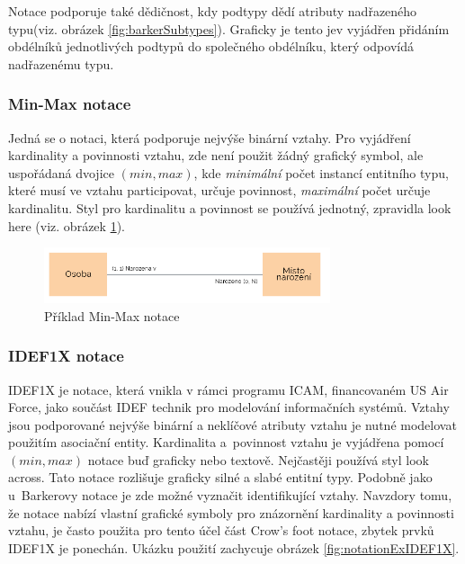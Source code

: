 \documentclass[czech,bachelor,public,dept460,male,oneside]{diploma}
\begin{document}
		Notace podporuje také dědičnost, kdy podtypy dědí atributy nadřazeného typu(viz. obrázek \ref{fig:barkerSubtypes}). Graficky je tento jev vyjádřen přidáním obdélníků jednotlivých podtypů do společného obdélníku, který odpovídá nadřazenému typu.
		
		\subsubsection{Min-Max notace} \label{minmax}
		Jedná se o notaci, která podporuje nejvýše binární vztahy. Pro vyjádření kardinality a povinnosti vztahu, zde není použit žádný grafický symbol, ale uspořádaná dvojice $(min, max)$, kde \emph{minimální} počet instancí entitního typu, které musí ve vztahu participovat, určuje povinnost, \emph{maximální} počet určuje kardinalitu. Styl pro kardinalitu a povinnost se používá jednotný, zpravidla look here (viz. obrázek \ref{fig:notationExMinMax}).
		
		\begin{figure}[!h]
			\centering
			\includegraphics[width=0.75\textwidth]{Figures/NotationExMinMax}
			\caption[Příklad Min-Max notace]{Příklad Min-Max notace \cite{whatIsERD}}
			\label{fig:notationExMinMax}
		\end{figure}
	
		\subsubsection{IDEF1X notace} \label{idef1x}
		IDEF1X \cite{compErNotations} je notace, která vnikla v rámci programu ICAM, financovaném US Air Force, jako součást IDEF technik pro modelování informačních systémů. Vztahy jsou podporované nejvýše binární a neklíčové atributy vztahu je nutné modelovat použitím asociační entity. Kardinalita a~povinnost vztahu je vyjádřena pomocí $(min, max)$ notace buď graficky nebo textově. Nejčastěji používá styl look across. Tato notace rozlišuje graficky silné a slabé entitní typy. Podobně jako u~Barkerovy notace je zde možné vyznačit identifikující vztahy. Navzdory tomu, že notace nabízí vlastní grafické symboly pro znázornění kardinality a povinnosti vztahu, je často použita pro tento účel část Crow's foot notace, zbytek prvků IDEF1X je ponechán. Ukázku použití zachycuje obrázek \ref{fig:notationExIDEF1X}.
		
\end{document}
